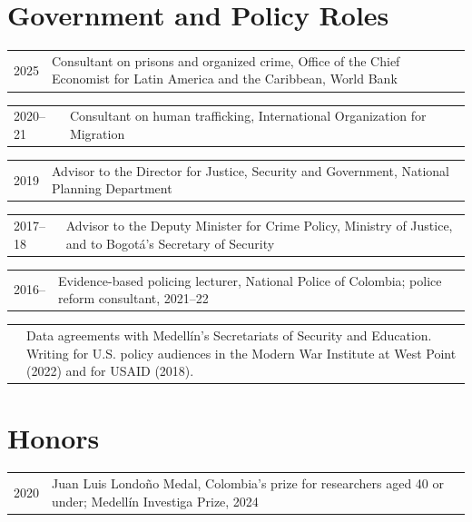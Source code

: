 \documentclass[10pt]{article}
\makeatletter
\newlength{\datecolwidth}\setlength{\datecolwidth}{1.25cm}
\newlength{\gapwidth}\setlength{\gapwidth}{0.3cm}
\newlength{\maincolwidth}\setlength{\maincolwidth}{\dimexpr\textwidth-\datecolwidth-\gapwidth\relax}
\newcommand{\cventry}[2]{%
  \begin{tabular}[t]{@{}p{\datecolwidth}@{\hspace{\gapwidth}}p{\maincolwidth}@{}}#1 & #2 \\\end{tabular}\vspace{0.05ex}\par}
\makeatother
\begin{document}
\section*{Government and Policy Roles}
\cventry{2025}{Consultant on prisons and organized crime, Office of the Chief Economist for Latin America and the Caribbean, World Bank}
\cventry{2020--21}{Consultant on human trafficking, International Organization for Migration}
\cventry{2019}{Advisor to the Director for Justice, Security and Government, National Planning Department}
\cventry{2017--18}{Advisor to the Deputy Minister for Crime Policy, Ministry of Justice, and to Bogot\'{a}'s Secretary of Security}
\cventry{2016--}{Evidence-based policing lecturer, National Police of Colombia; police reform consultant, 2021--22}
\cventry{}{Data agreements with Medell\'{i}n's Secretariats of Security and Education. Writing for U.S. policy audiences in the Modern War Institute at West Point (2022) and for USAID (2018).}

\section*{Honors}
\cventry{2020}{Juan Luis Londo\~{n}o Medal, Colombia's prize for researchers aged 40 or under; Medell\'{i}n Investiga Prize, 2024}
\end{document}
